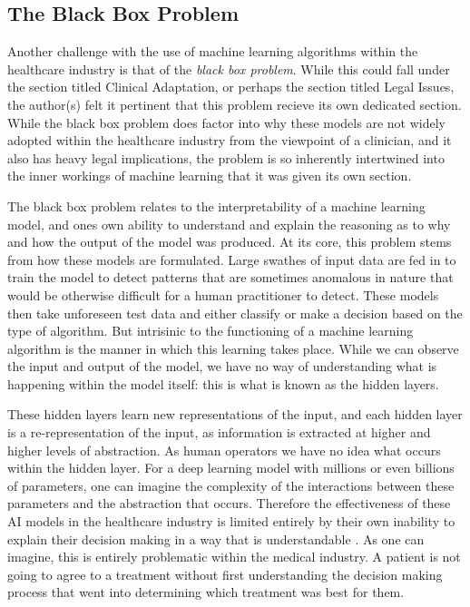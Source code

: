 \documentclass[12pt]{article}
\begin{document}
\subsection{The Black Box Problem}

Another challenge with the use of machine learning algorithms within the healthcare industry is that of the \textit{black box problem}. While this could fall under the section titled Clinical Adaptation, or perhaps the section titled Legal Issues, the author(s) felt it pertinent that this problem recieve its own dedicated section. While the black box problem does factor into why these models are not widely adopted within the healthcare industry from the viewpoint of a clinician, and it also has heavy legal implications, the problem is so inherently intertwined into the inner workings of machine learning that it was given its own section. \

The black box problem relates to the interpretability of a machine learning model, and ones own ability to understand and explain the reasoning as to why and how the output of the model was produced. At its core, this problem stems from how these models are formulated. Large swathes of input data are fed in to train the model to detect patterns that are sometimes anomalous in nature that would be otherwise difficult for a human practitioner to detect. These models then take unforeseen test data and either classify or make a decision based on the type of algorithm. But intrisinic to the functioning of a machine learning algorithm is the manner in which this learning takes place. While we can observe the input and output of the model, we have no way of understanding what is happening within the model itself: this is what is known as the hidden layers. \

These hidden layers learn new representations of the input, and each hidden layer is a re-representation of the input, as information is extracted at higher and higher levels of abstraction. As human operators we have no idea what occurs within the hidden layer. For a deep learning model with millions or even billions of parameters, one can imagine the complexity of the interactions between these parameters and the abstraction that occurs. Therefore the effectiveness of these AI models in the healthcare industry is limited entirely by their own inability to explain their decision making in a way that is understandable \cite{Kelly_2019, Guan_2019}. As one can imagine, this is entirely problematic within the medical industry. A patient is not going to agree to a treatment without first understanding the decision making process that went into determining which treatment was best for them. \
\end{document}

